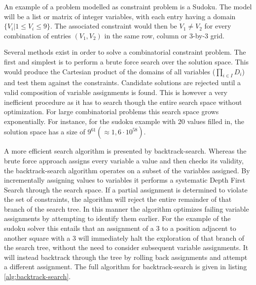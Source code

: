 An example of a problem modelled as constraint problem is a Sudoku. The model will be a list or matrix of integer variables, with each entry having a domain $\{V_i|1\leq V_i\leq 9\}$. The associated constraint would then be $V_1 \neq V_2$ for every combination of entries $(V_1,V_2)$ in the same row, column or 3-by-3 grid.

Several methods exist in order to solve a combinatorial constraint problem. The first and simplest is to perform a brute force search over the solution space. This would produce the Cartesian product of the domains of all variables ($\prod_{i\in I} D_i$) and test them against the constraints. Candidate solutions are rejected until a valid composition of variable assignments is found. This is however a very inefficient procedure as it has to search though the entire search space without optimization. For large combinatorial problems this search space grows exponentially. For instance, for the sudoku example with 20 values filled in, the solution space has a size of $9^{61}(\approx 1,6\cdot 10^{58})$.

A more efficient search algorithm is presented by backtrack-search. Whereas the brute force approach assigns every variable a value and then checks its validity, the backtrack-search algorithm operates on a subset of the variables assigned. By incrementally assigning values to variables it performs a systematic Depth First Search through the search space. If a partial assignment is determined to violate the set of constraints, the algorithm will reject the entire remainder of that branch of the search tree. In this manner the algorithm optimizes failing variable assignments by attempting to identify them earlier. For the example of the sudoku solver this entails that an assignment of a 3 to a position adjacent to another square with a 3 will immediately halt the exploration of that branch of the search tree, without the need to consider subsequent variable assignments. It will instead backtrack through the tree by rolling back assignments and attempt a different assignment. The full algorithm for backtrack-search is given in listing \ref{alg:backtrack-search}.



